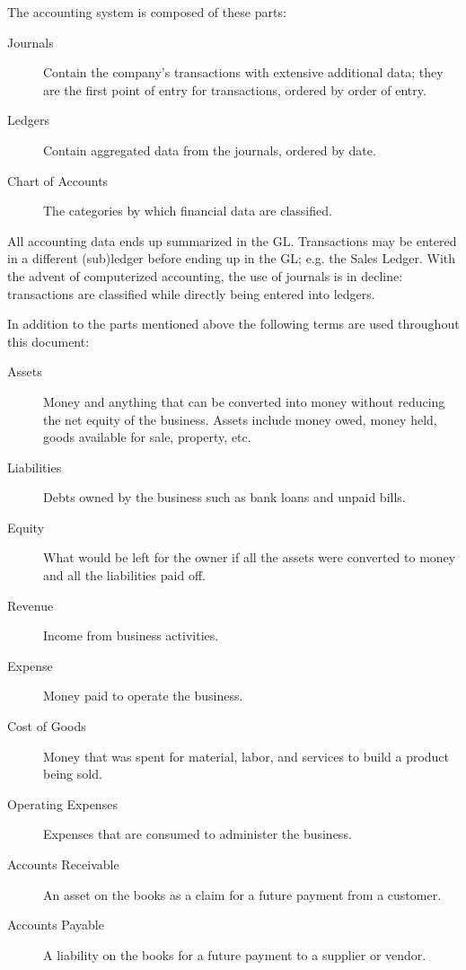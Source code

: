 The accounting system is composed of these parts:
\begin{description}
        \item [Journals] Contain the company's transactions with extensive additional data; they are the first point of entry for transactions, ordered by order of entry.
        \item [Ledgers] Contain aggregated data from the journals, ordered by date.
        \item [Chart of Accounts] The categories by which financial data are classified.
\end{description}

All accounting data ends up summarized in the \acrshort{GL}. Transactions may be entered in a different (sub)ledger before ending up in the \acrshort{GL}; e.g. the Sales Ledger. With the advent of computerized accounting, the use of journals is in decline: transactions are classified while directly being entered into ledgers.

In addition to the parts mentioned above the following terms are used throughout this document:
\begin{description}
        \item [Assets] Money and anything that can be converted into money without reducing
        the net equity of the business. Assets include money owed, money held, goods
        available for sale, property, etc.
        \item [Liabilities] Debts owned by the business such as bank loans and unpaid bills.
        \item [Equity] What would be left for the owner if all the assets were converted to
        money and all the liabilities paid off.
        \item [Revenue] Income from business activities.
        \item [Expense] Money paid to operate the business.
        \item [Cost of Goods] Money that was spent for material, labor, and services to build a product being sold.
        \item [Operating Expenses] Expenses that are consumed to administer the business.
        \item [Accounts Receivable] An asset on the books as a claim for a future payment
        from a customer.
        \item [Accounts Payable] A liability on the books for a future payment to a supplier
        or vendor.
\end{description}

